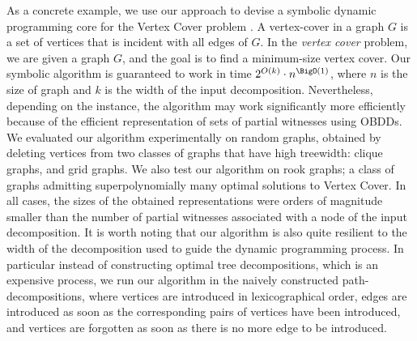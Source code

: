 As a concrete example, we use our approach to devise a symbolic dynamic programming core for the {\sc Vertex Cover} problem \cite{chen2024vertex,cai2017finding}. A vertex-cover in a graph $G$ is a set of vertices that is incident with all edges of $G$. In the {\em vertex cover} problem, we are given a graph $G$, and the goal is to find a minimum-size vertex cover. Our symbolic algorithm is guaranteed to work in time $2^{O(k)}\cdot n^{\BigO(1)}$, where $n$ is the size of graph and $k$ is the width of the input decomposition. Nevertheless, depending on the instance, the algorithm may work significantly more efficiently because of the efficient representation of sets of partial witnesses using OBDDs. We evaluated our algorithm experimentally on random graphs, obtained by deleting vertices from two classes of graphs that have high treewidth: clique graphs, and grid graphs. We also test our algorithm on rook graphs; a class of graphs admitting superpolynomially many optimal solutions to {\sc Vertex Cover}. In all cases, the sizes of the obtained representations were orders of magnitude smaller than the number of partial witnesses associated with a node of the input decomposition.  It is worth noting that our algorithm is also quite resilient to the width of the decomposition used to guide the dynamic programming process. In particular instead of constructing optimal tree decompositions, which is an expensive process, we run our algorithm in the naively constructed path-decompositions, where vertices are introduced in lexicographical order, edges are introduced as soon as the corresponding pairs of vertices have been introduced, and vertices are forgotten as soon as there is no more edge to be introduced. 




